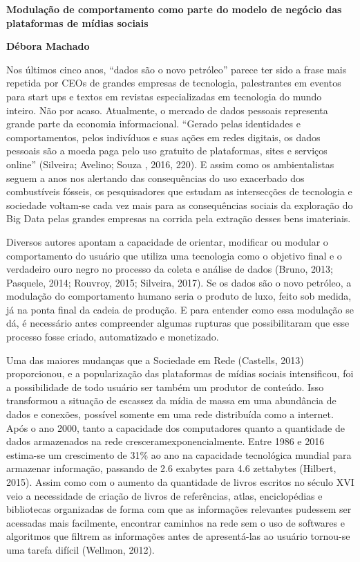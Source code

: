 \textbf{Modulação de comportamento como parte do modelo de negócio das
plataformas de mídias sociais }

\textbf{Débora Machado}

Nos últimos cinco anos, ``dados são o novo petróleo'' parece ter sido a
frase mais repetida por CEOs de grandes empresas de tecnologia,
palestrantes em eventos para start ups e textos em revistas
especializadas em tecnologia do mundo inteiro. Não por acaso.
Atualmente, o mercado de dados pessoais representa grande parte da
economia informacional. ``Gerado pelas identidades e comportamentos,
pelos indivíduos e suas ações em redes digitais, os dados pessoais são a
moeda paga pelo uso gratuito de plataformas, sites e serviços online''
(Silveira; Avelino; Souza , 2016, 220). E assim como os ambientalistas
seguem a anos nos alertando das consequências do uso exacerbado dos
combustíveis fósseis, os pesquisadores que estudam as intersecções de
tecnologia e sociedade voltam-se cada vez mais para as consequências
sociais da exploração do Big Data pelas grandes empresas na corrida pela
extração desses bens imateriais.

Diversos autores apontam a capacidade de orientar, modificar ou modular
o comportamento do usuário que utiliza uma tecnologia como o objetivo
final e o verdadeiro ouro negro no processo da coleta e análise de dados
(Bruno, 2013; Pasquele, 2014; Rouvroy, 2015; Silveira, 2017). Se os
dados são o novo petróleo, a modulação do comportamento humano seria o
produto de luxo, feito sob medida, já na ponta final da cadeia de
produção. E para entender como essa modulação se dá, é necessário antes
compreender algumas rupturas que possibilitaram que esse processo fosse
criado, automatizado e monetizado.

Uma das maiores mudanças que a Sociedade em Rede (Castells, 2013)
proporcionou, e a popularização das plataformas de mídias sociais
intensificou, foi a possibilidade de todo usuário ser também um produtor
de conteúdo. Isso transformou a situação de escassez da mídia de massa
em uma abundância de dados e conexões, possível somente em uma rede
distribuída como a internet. Após o ano 2000, tanto a capacidade dos
computadores quanto a quantidade de dados armazenados na rede
cresceramexponencialmente. Entre 1986 e 2016 estima-se um crescimento de
31\% ao ano na capacidade tecnológica mundial para armazenar informação,
passando de 2.6 exabytes para 4.6 zettabytes (Hilbert, 2015). Assim como
com o aumento da quantidade de livros escritos no século XVI veio a
necessidade de criação de livros de referências, atlas, enciclopédias e
bibliotecas organizadas de forma com que as informações relevantes
pudessem ser acessadas mais facilmente, encontrar caminhos na rede sem o
uso de softwares e algoritmos que filtrem as informações antes de
apresentá-las ao usuário tornou-se uma tarefa difícil (Wellmon, 2012).


